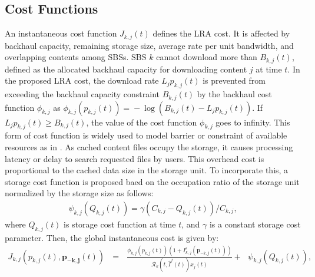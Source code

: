 \documentclass{book}
\begin{document}
    
    
    
    \subsection{Cost Functions}
    
    An instantaneous cost function $J_{k,j}(t)$ defines the LRA cost. It is affected by backhaul capacity, remaining storage size, average rate per unit bandwidth, and overlapping contents among SBSs. 
    SBS $k$ cannot download more than $B_{k,j}(t)$, defined as the allocated backhaul capacity for downloading content $j$ at time $t$. 
    In the proposed LRA cost, the download rate $L_jp_{k,j}(t)$ is prevented from exceeding the backhaul capacity constraint $B_{k,j}(t)$ by the backhaul cost function $\phi_{k,j}$ as $\phi_{k,j}(p_{k,j}(t))\!=\! -\log (B_{k,j}(t)-L_jp_{k,j}(t))$. If $L_jp_{k,j}(t)\! \geq \!{B_{k,j}(t)}$, the value of the cost function $\phi_{k,j}$ goes to infinity. This form of cost function is widely used to model barrier or constraint of available resources as in \cite{MFG_caching}.
    {As cached content files occupy the storage, it causes processing latency \cite{Storage_cost} or delay to search requested files by users.    
    This overhead cost is proportional to the cached data size in the storage unit.} To incorporate this, a storage cost function is proposed baed on the occupation ratio of the storage unit normalized by the storage size as follows:
    \begin{align}
    \psi_{k,j}(Q_{k,j}(t))= \gamma(C_{k,j}-Q_{k,j}(t))/{C_{k,j}},  \label{storage cost}
    \end{align}
    {where $Q_{k,j}(t)$ is storage cost function at time $t$, and $\gamma$ is a constant storage cost parameter.}
    \noindent Then, the global instantaneous cost is given by:
    \begin{align}
    J_{k,j}(p_{k,j}(t),\boldsymbol{p_{-k,j}}(t))\text{ }=\text{ }\frac{\phi_{k,j}(p_{k,j}(t))(1\!+\!I^r_{k,j}(\boldsymbol{p}_{-k,j}(t)))}{\mathcal{R}_k(t,\hat{I}^f(t))x_j(t)}+\text{ }\psi_{k,j}(Q_{k,j}(t)), \label{inst_global_cost}
    \end{align}
\end{document}
